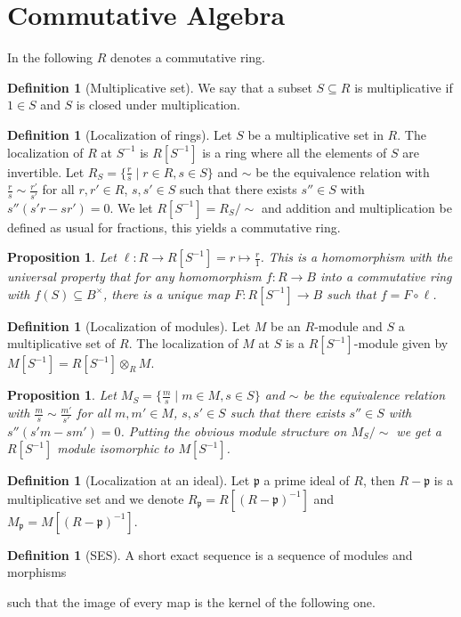 \documentclass[paper=a4, fontsize=12pt]{scrartcl} %
\newtheorem{prop}[thm]{Proposition}
\theoremstyle{definition}
\newtheorem{defn}[thm]{Definition}
\theoremstyle{remark}
\newcommand{\lp}{{\mathfrak{p}}}
\begin{document}
\section{Commutative Algebra}
In the following $R$ denotes a commutative ring.
\begin{defn}[Multiplicative set]
	We say that a subset $S\subseteq R$ is multiplicative if $1 \in S$ and $S$ is closed under multiplication.
\end{defn}
\begin{defn}[Localization of rings]
	Let $S$ be a multiplicative set in $R$. The localization of $R$ at $S^{-1}$ is $R[S^{-1}]$ is a ring where all the elements of $S$ are invertible. Let $R_S = \{\frac{r}{s} \mid r \in R, s\in S\}$ and $\sim$ be the equivalence relation with $\frac{r}{s} \sim \frac{r'}{s'}$ for all $r,r' \in R$, $s, s' \in S$ such that there exists $s'' \in S$ with $s''(s'r-sr') = 0$. We let $R[S^{-1}] = R_S/\sim$ and addition and multiplication be defined as usual for fractions, this yields a commutative ring.
\end{defn}
\begin{prop}
	Let $\ell:R\rightarrow R[S^{-1}] = r \mapsto \frac{r}{1}$. This is a homomorphism with the universal property that for any homomorphism $f:R\rightarrow B$ into a commutative ring with $f(S) \subseteq B^{\times}$, there is a unique map $F:R[S^{-1}] \rightarrow B$ such that $f = F\circ \ell$.
\end{prop}
\begin{defn}[Localization of modules]
	Let $M$ be an $R$-module and $S$ a multiplicative set of $R$. The localization of $M$ at $S$ is a $R[S^{-1}]$-module given by $M[S^{-1}] = R[S^{-1}] \otimes_R M$.
\end{defn}
\begin{prop}
	Let $M_S = \{\frac{m}{s} \mid m \in M, s \in S\}$ and $\sim$ be the equivalence relation with $\frac{m}{s} \sim \frac{m'}{s'}$ for all $m,m' \in M$, $s,s' \in S$ such that there exists $s'' \in S$ with $s''(s'm- sm') = 0$. Putting the obvious module structure on $M_S/\sim$ we get a $R[S^{-1}]$ module isomorphic to $M[S^{-1}]$.
\end{prop}
\begin{defn}[Localization at an ideal]
	Let $\lp$ a prime ideal of $R$, then $R-\lp$ is a multiplicative set and we denote $R_{\lp} = R[(R-\lp)^{-1}]$ and $M_{\lp} = M[(R-\lp)^{-1}]$.
\end{defn}
\begin{defn}[SES]
	A short exact sequence is a sequence of modules and morphisms\\
	\begin{figure}[H]
	\end{figure}
	such that the image of every map is the kernel of the following one.
\end{defn}
\end{document}
